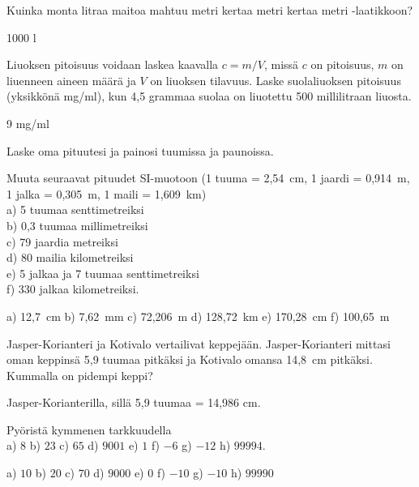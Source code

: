 \begin{tehtavasivu}
\begin{tehtava}
Kuinka monta litraa maitoa mahtuu metri kertaa metri kertaa metri -laatikkoon?
	\begin{vastaus}
	1000 l
	\end{vastaus}
\end{tehtava}

\begin{tehtava}
Liuoksen pitoisuus voidaan laskea kaavalla $c=m/V$, missä $c$ on pitoisuus, $m$ on liuenneen aineen määrä ja $V$ on liuoksen tilavuus.
Laske suolaliuoksen pitoisuus (yksikkönä mg/ml), kun 4,5 grammaa suolaa on liuotettu 500 millilitraan liuosta.
\begin{vastaus}
9 mg/ml
\end{vastaus}
\end{tehtava}

\begin{tehtava}
Laske oma pituutesi ja painosi tuumissa ja paunoissa.
\end{tehtava}

\begin{tehtava}
Muuta seuraavat pituudet SI-muotoon (1 tuuma = 2,54~cm, 1 jaardi = 0,914~m, 1 jalka = 0,305~m, 1 maili = 1,609~km) \\
a) 5 tuumaa senttimetreiksi \\
b) 0,3 tuumaa millimetreiksi \\
c) 79 jaardia metreiksi \\
d) 80 mailia kilometreiksi \\
e) 5 jalkaa ja 7 tuumaa senttimetreiksi \\
f) 330 jalkaa kilometreiksi.
\begin{vastaus}
a) 12,7~cm \qquad
b) 7,62~mm \qquad
c) 72,206~m \qquad
d) 128,72~km \qquad
e) 170,28~cm \qquad
f) 100,65~m
\end{vastaus}
\end{tehtava}

\begin{tehtava}
Jasper-Korianteri ja Kotivalo vertailivat keppejään. Jasper-Korianteri mittasi oman keppinsä 5,9 tuumaa pitkäksi ja Kotivalo omansa 14,8~cm pitkäksi. Kummalla on pidempi keppi?
\begin{vastaus}
Jasper-Korianterilla, sillä 5,9 tuumaa = 14,986 cm.
\end{vastaus}
\end{tehtava}

\begin{tehtava}
Pyöristä kymmenen tarkkuudella \\
a) $8$ \qquad
b) $23$ \qquad
c) $65$ \qquad
d) $9001$ \qquad
e) $1$ \qquad
f) $-6$ \qquad
g) $-12$ \qquad
h) $99994$.
\begin{vastaus}
a) $10$ \qquad
b) $20$ \qquad
c) $70$ \qquad
d) $9000$ \qquad
e) $0$ \qquad
f) $-10$ \qquad
g) $-10$ \qquad
h) $99990$
\end{vastaus}
\end{tehtava}


\end{tehtavasivu}
